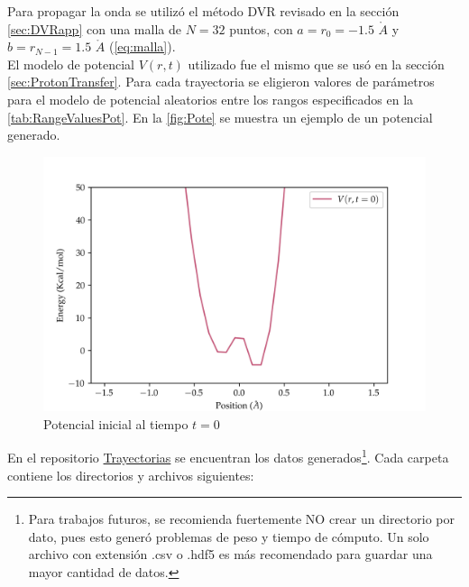 Para propagar la onda se utilizó el método \acs{DVR} revisado en la sección \autoref{sec:DVRapp} con una malla de $N=32$ puntos, con $a=r_0=-1.5\,\,\mathring{A}$ y $b=r_{N-1}=1.5\,\,\mathring{A}$ (\autoref{eq:malla}).
\\
El modelo de potencial $V(r,t)$ utilizado fue el mismo que se usó en la sección \autoref{sec:ProtonTransfer}. Para cada trayectoria se eligieron valores de parámetros para el modelo de potencial aleatorios entre los rangos especificados en la \autoref{tab:RangeValuesPot}. En la \autoref{fig:Pote} se muestra un ejemplo de un potencial generado.
\begin{figure}[H]
  \centering
  \includegraphics[width=1\textwidth]{./img/DataPot.png}
  \caption{Potencial inicial al tiempo $t=0$}
  \label{fig:Pote}
\end{figure}

En el repositorio \href{https://github.com/Jessi-MM/PropagatorLearning/tree/main/Data_Gaussian}{\faGithub Trayectorias} se encuentran los datos generados\footnote{\textcolor{CTtitle}{\faExclamationTriangle} Para trabajos futuros, se recomienda fuertemente NO crear un directorio por dato, pues esto generó problemas de peso y tiempo de cómputo. Un solo archivo con extensión .csv o .hdf5 es más recomendado para guardar una mayor cantidad de datos.}. Cada carpeta contiene los directorios y archivos siguientes:

